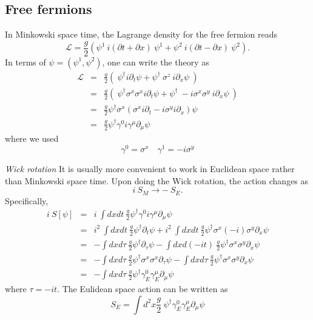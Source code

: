 \documentclass[submission, PhysLectNotes]{SciPost}
\begin{document}
\subsection{Free fermions}
In Minkowski space time, the Lagrange density for the free fermion reads
\begin{equation}
    \mathcal{L} = \frac{g}{2}\left(\psi^1\ i(\partial t + \partial x)\ \psi^1 + \psi^2\ i(\partial t - \partial x)\ \psi^2 \right).
\end{equation}
In terms of $\psi = (\psi^1,\psi^2)$, one can write the theory as
\begin{eqnarray}
    \mathcal{L} &=& \frac{g}{2} \left ( \ \psi^\dagger i\partial_t \psi + \psi^\dagger \ \sigma^z \ i\partial_x \psi \ \right) \nonumber \\
    &=& \frac{g}{2} \left ( \ \psi^\dagger \sigma^x\sigma^x i\partial_t \psi + \psi^\dagger \ -i\sigma^x\sigma^y \ i\partial_x \psi \ \right) \nonumber\\
    &=& \frac{g}{2} \psi^\dagger \sigma^x \left(\sigma^x i \partial_t - i\sigma^y i\partial_x \right) \psi \nonumber \\
    &=& \frac{g}{2} \psi^\dagger \gamma^0 i\gamma^\mu \partial_\mu \psi
\end{eqnarray}
where we used 
\begin{equation}
    \gamma^0 = \sigma^x \quad \gamma^1 = -i\sigma^y
\end{equation}

{\it Wick rotation}
It is usually more convenient to work in Euclidean space rather than Minkowski space time. Upon doing the Wick rotation, the action changes as 
\begin{equation}
    i\ S_M \rightarrow -\ S_E.
\end{equation}
Specifically, 
\begin{eqnarray}
    i\ S[\psi] &=& i\ \int dxdt \ \frac{g}{2} \psi^\dagger \gamma^0 i\gamma^\mu \partial_\mu \psi \nonumber \\
    &=& i^2 \ \int dxdt \ \frac{g}{2} \psi^\dagger \partial_t \psi + i^2 \ \int dxdt \ \frac{g}{2} \psi^\dagger \sigma^x (-i) \sigma^y \partial_x \psi \nonumber \\
    &=& -\int dxd\tau \ \frac{g}{2} \psi^\dagger \partial_\tau \psi - \int dxd(-i t) \ \frac{g}{2} \psi^\dagger \sigma^x \sigma^y \partial_x \psi \nonumber \\
    &=&  -\int dxd\tau \ \frac{g}{2} \psi^\dagger \sigma^x\sigma^x\partial_\tau \psi - \int dxd\tau \ \frac{g}{2} \psi^\dagger \sigma^x \sigma^y \partial_x \psi \nonumber \\
    &=&  -\int dxd\tau \ \frac{g}{2} \psi^\dagger \gamma^0_E\gamma^\mu_E\partial_\mu \psi
\end{eqnarray}
where $\tau = -it$. The Eulidean space action can be written as
\begin{equation}
    S_E = \int d^2x \frac{g}{2} \ \psi^\dagger \gamma^0_E\gamma^\mu_E\partial_\mu \psi
\end{equation}
\end{document}
